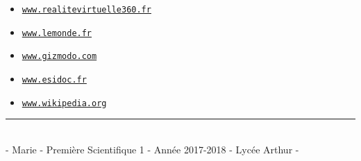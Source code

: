 \documentclass[11pt, a4paper]{article}
\begin{document}
\begin{itemize}
  \setlength{\itemsep}{-0.3em}
  \item \href{https://www.realitevirtuelle360.com/definition-qu-est-ce-que-la-realite-virtuelle/}{\tt{www.realitevirtuelle360.fr}}
  \item \href{http://www.lemonde.fr/grands-formats/visuel/2017/04/17/comment-la-realite-virtuelle-joue-avec-votre-cerveau\_5112541\_4497053.html}{\tt{www.lemonde.fr}}
  \item \href{https://gizmodo.com/5994263/whats-inside-the-oculus-rift-virtual-reality-headset}{\tt{www.gizmodo.com}}
  \item \href{http://0540044e.esidoc.fr/search.php?pid=\&action=Record\&id=MF\_MF1501211431968\_2015\&num=3\&total=14}{\tt{www.esidoc.fr}}
  \item \href{https://fr.wikipedia.org/wiki/R%C3%A9alit%C3%A9_virtuelle}{\tt{www.wikipedia.org}}
\end{itemize}

\vfill
\begin{center}
\rule{0.90\linewidth}{0.5pt}\\
\small
- Marie  - Première Scientifique 1 - Année 2017-2018 - Lycée Arthur  -
\end{center}
\end{document}
